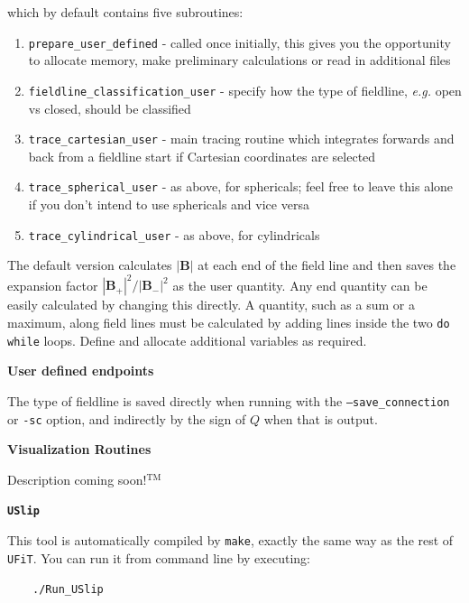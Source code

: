 \documentclass[12pt,twoside]{article}
\begin{document}
which by default contains five subroutines:
\begin{enumerate}
\item\texttt{prepare\_user\_defined} - called once initially, this gives you the opportunity to allocate memory, make preliminary calculations or read in additional files

\item\texttt{fieldline\_classification\_user} - specify how the type of fieldline, \textit{e.g.} open vs closed, should be classified

\item\texttt{trace\_cartesian\_user} - main tracing routine which integrates forwards and back from a fieldline start if Cartesian coordinates are selected

\item\texttt{trace\_spherical\_user} - as above, for sphericals; feel free to leave this alone if you don't intend to use sphericals and vice versa

\item\texttt{trace\_cylindrical\_user} - as above, for cylindricals
\end{enumerate}

The default version calculates $|\mathbf{B}|$ at each end of the field line and then saves the expansion factor $|\mathbf{B}_+|^2/|\mathbf{B}_-|^2$ as the user quantity. Any end quantity can be easily calculated by changing this directly. A quantity, such as a sum or a maximum, along field lines must be calculated by adding lines inside the two \texttt{do while} loops. Define and allocate additional variables as required.


{\large \textbf{User defined endpoints}}

The type of fieldline is saved directly when running with the \texttt{--save\_connection} or \texttt{-sc} option, and indirectly by the sign of $Q$ when that is output. 




\vspace{3mm}
{\Large \textbf{Visualization Routines}}

Description coming soon!$^{\mathrm{TM}}$


\newpage
{\Large \textbf{\texttt{USlip}}}

This tool is automatically compiled by \texttt{make}, exactly the same way as the rest of \texttt{UFiT}. You can run it from command line by executing:

$\quad\quad$\texttt{./Run\_USlip}
\end{document}
